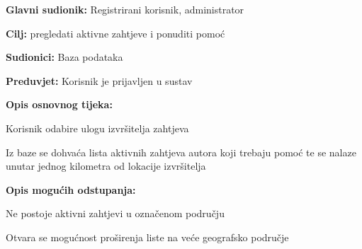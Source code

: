 \noindent {}
\begin{packed_item}
	
	\item \textbf{Glavni sudionik: }Registrirani korisnik, administrator
	\item  \textbf{Cilj:} pregledati aktivne zahtjeve i ponuditi pomoć
	\item  \textbf{Sudionici:} Baza podataka
	\item  \textbf{Preduvjet:} Korisnik je prijavljen u sustav
	\item  \textbf{Opis osnovnog tijeka:}
	
	\item[] \begin{packed_enum}
		
		\item Korisnik odabire ulogu izvršitelja zahtjeva
		\item Iz baze se dohvaća lista aktivnih zahtjeva autora koji trebaju pomoć te se nalaze unutar jednog kilometra od lokacije izvršitelja
	\end{packed_enum}
	
	\item  \textbf{Opis mogućih odstupanja:}
	
	\item[] \begin{packed_item}
		
		\item[2.a] Ne postoje aktivni zahtjevi u označenom području
		\item[] \begin{packed_enum}
			
			\item Otvara se mogućnost proširenja liste na veće geografsko područje
			
		\end{packed_enum}
	\end{packed_item}
\end{packed_item}
\noindent {}
